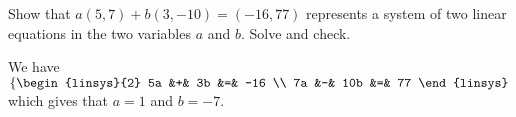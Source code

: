 

\begin{Exercise}[
name={},
title={}, 
difficulty=0,
origin={\cite{SM}}]
Show that $a(5,7)+b(3,-10)=(-16,77)$ represents a system of two linear equations in the two variables $a$ and $b$. Solve and check.
\end{Exercise}

\begin{Answer}
We have $\left\{\begin{linsys}{2} 5a &+& 3b &=& -16 \\ 7a &-& 10b &=& 77 \end{linsys}\right.$ which gives that $a=1$ and $b=-7$.
\end{Answer}

